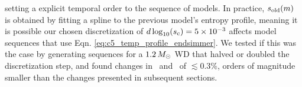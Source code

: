 \noindent setting a explicit temporal order to the sequence of models.  In practice, $s_\mathrm{old}(m)$ is obtained by fitting a spline to the previous model's entropy profile, meaning it is possible our chosen discretization of $d\log_{10}(\Sc) = 5 \times 10^{-3}$ affects model sequences that use Eqn. \ref{eq:c5_temp_profile_endsimmer}.  We tested if this was the case by generating sequences for a $1.2\,\Msun$ WD that halved or doubled the discretization step, and found changes in \rhoc\ and \Tc\ of $\lesssim0.3$\%, orders of magnitude smaller than the changes presented in subsequent sections.





